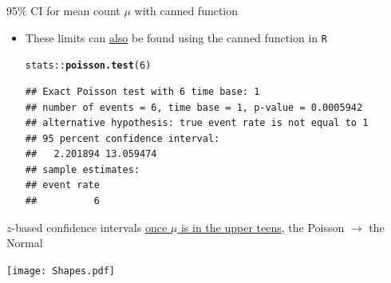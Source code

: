 \documentclass[10pt]{beamer}\usepackage[]{graphicx}\usepackage[]{color}
\makeatletter
\newcommand{\hlnum}[1]{\textcolor[rgb]{0.686,0.059,0.569}{#1}}%
\newcommand{\hlopt}[1]{\textcolor[rgb]{0,0,0}{#1}}%
\newcommand{\hlstd}[1]{\textcolor[rgb]{0.345,0.345,0.345}{#1}}%
\newcommand{\hlkwd}[1]{\textcolor[rgb]{0.737,0.353,0.396}{\textbf{#1}}}%
\newenvironment{kframe}{%
 \def\at@end@of@kframe{}%
 \ifinner\ifhmode%
  \def\at@end@of@kframe{\end{minipage}}%
  \begin{minipage}{\columnwidth}%
 \fi\fi%
 \def\FrameCommand##1{\hskip\@totalleftmargin \hskip-\fboxsep
 \colorbox{shadecolor}{##1}\hskip-\fboxsep
     \hskip-\linewidth \hskip-\@totalleftmargin \hskip\columnwidth}%
 \MakeFramed {\advance\hsize-\width
   \@totalleftmargin\z@ \linewidth\hsize
   \@setminipage}}%
 {\par\unskip\endMakeFramed%
 \at@end@of@kframe}
\newenvironment{knitrout}{}{} %
\makeatother
\begin{document}
\begin{frame}[fragile]{95\% CI for mean count $\mu$ with canned function}
	\begin{itemize}
		\setlength\itemsep{1em}
		\item These limits can \underline{also} be found using  the canned function in \texttt{R} 
		
\begin{knitrout}\tiny
{}\color{fgcolor}\begin{kframe}
\begin{alltt}
\hlstd{stats}\hlopt{::}\hlkwd{poisson.test}\hlstd{(}\hlnum{6}\hlstd{)}
\end{alltt}
\begin{verbatim}
## Exact Poisson test with 6 time base: 1 
## number of events = 6, time base = 1, p-value = 0.0005942
## alternative hypothesis: true event rate is not equal to 1 
## 95 percent confidence interval:
##   2.201894 13.059474 
## sample estimates:
## event rate 
##          6
\end{verbatim}
\end{kframe}
\end{knitrout}
		
	\end{itemize}
\end{frame}



\begin{frame}{$z$-based confidence intervals}
	\scriptsize
	\underline{once $\mu$ is in the upper teens}, the Poisson $\to$ the Normal
	
	\centering
	\texttt{[image: Shapes.pdf]}
	
\end{frame}
\end{document}
